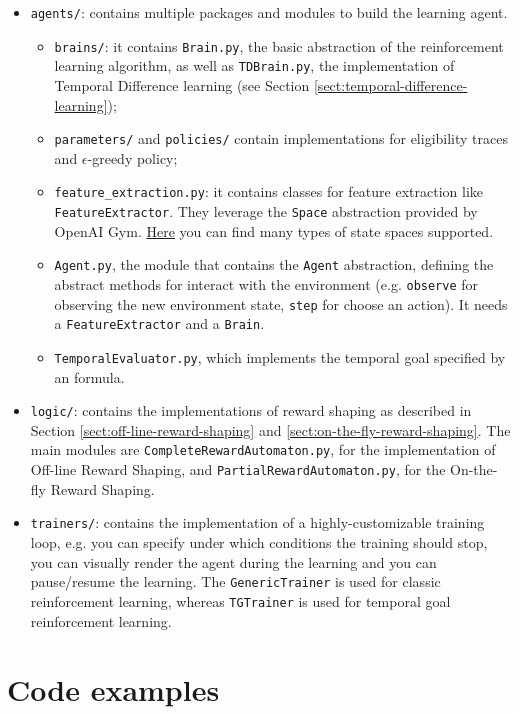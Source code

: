 \begin{itemize}
	\item \texttt{agents/}: contains multiple packages and modules to build the learning agent.
	\begin{itemize}
		\item \texttt{brains/}: it contains \texttt{Brain.py}, the basic abstraction of the reinforcement learning algorithm, as well as \texttt{TDBrain.py}, the implementation of Temporal Difference learning (see Section \ref{sect:temporal-difference-learning});
		\item \texttt{parameters/} and \texttt{policies/} contain implementations for eligibility traces and $\epsilon$-greedy policy;
		\item \texttt{feature\_extraction.py}: it contains classes for feature extraction like \texttt{FeatureExtractor}. They leverage the \texttt{Space} abstraction provided by OpenAI Gym. \href{https://github.com/openai/gym/tree/master/gym/spaces}{Here} you can find many types of state spaces supported.
		\item \texttt{Agent.py}, the module that contains the \texttt{Agent} abstraction, defining the abstract methods for interact with the environment (e.g. \texttt{observe} for observing the new environment state, \texttt{step} for choose an action). It needs a \texttt{FeatureExtractor} and a \texttt{Brain}. 
		\item \texttt{TemporalEvaluator.py}, which implements the temporal goal specified by an \LLf formula.
	\end{itemize}
	\item \texttt{logic/}: contains the implementations of reward shaping as described in Section \ref{sect:off-line-reward-shaping} and \ref{sect:on-the-fly-reward-shaping}. The main modules are \texttt{CompleteRewardAutomaton.py}, for the implementation of Off-line Reward Shaping, and \texttt{PartialRewardAutomaton.py}, for the On-the-fly Reward Shaping.
	\item \texttt{trainers/}: contains the implementation of a highly-customizable training loop, e.g. you can specify under which conditions the training should stop, you can visually render the agent during the learning and you can pause/resume the learning. The \texttt{GenericTrainer} is used for classic reinforcement learning, whereas \texttt{TGTrainer} is used for temporal goal reinforcement learning.
\end{itemize}

\section{Code examples}
